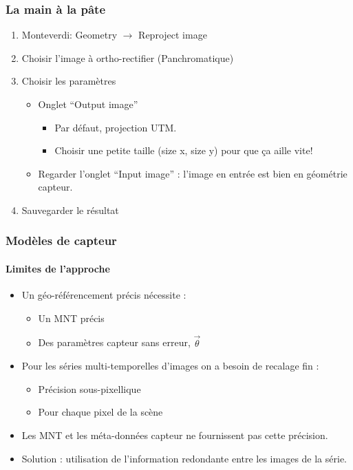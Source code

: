 \documentclass[compress]{beamer}
\begin{document}
\begin{frame}
\frametitle{La main à la pâte}
\begin{enumerate}
\item Monteverdi: Geometry $\rightarrow$ Reproject image
\item Choisir l'image à ortho-rectifier (Panchromatique)
\item Choisir les paramètres
  \begin{itemize}
  \item Onglet ``Output image''
    \begin{itemize}
    \item Par défaut, projection UTM.
    \item Choisir une petite taille (size x, size y) pour que ça aille
    vite!
    \end{itemize}
  \item Regarder l'onglet ``Input image'' : l'image en entrée est bien
    en géométrie capteur.
  \end{itemize}
\item Sauvegarder le résultat

\end{enumerate}
\end{frame}


\begin{frame}
  \frametitle{Modèles de capteur}
  \framesubtitle{Limites de l'approche}

  \begin{itemize}
    \item Un géo-référencement précis nécessite :
      \begin{itemize}
	\item Un MNT précis
	\item Des paramètres capteur sans erreur, $\vec\theta$
      \end{itemize}
    \item Pour les séries multi-temporelles d'images on a besoin de
      \alert{recalage fin} :
      \begin{itemize}
      \item Précision sous-pixellique
      \item Pour chaque pixel de la scène
      \end{itemize}
    \item Les MNT et les méta-données capteur ne fournissent pas cette
      précision.
    \item Solution : utilisation de l'information redondante entre les
      images de la série.
  \end{itemize}
\end{frame}
\end{document}
